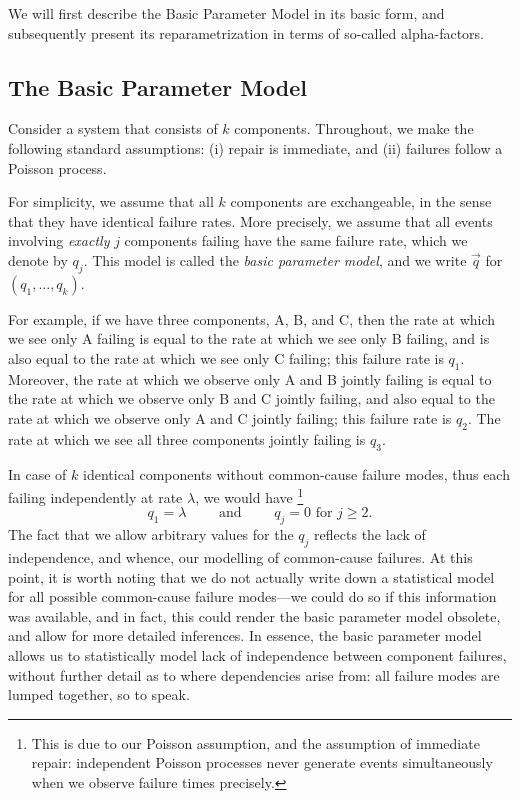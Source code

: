 We will first describe the Basic Parameter Model in its basic form,
and subsequently present its reparametrization in terms of so-called alpha-factors.


\subsection{The Basic Parameter Model}

Consider a system that consists of $k$ components.
Throughout, we make the following standard assumptions:
(i) repair is immediate, and
(ii) failures follow a Poisson process.

For simplicity, we assume that all $k$ components are exchangeable,
in the sense that they have identical failure rates.
More precisely,
we assume that all events involving \emph{exactly} $j$ components failing
have the same failure rate, which we denote by $q_j$.
This model is called the \emph{basic parameter model},
and we write $\vec{q}$ for $(q_1,\dots,q_k)$.

For example, if we have three components, A, B, and C,
then the rate at which we see only A failing
is equal to the rate at which we see only B failing,
and is also equal to the rate at which we see only C failing;
this failure rate is $q_1$.
Moreover, the rate at which we observe only A and B jointly failing
is equal to the rate at which we observe only B and C jointly failing,
and also equal to the rate at which we observe only A and C jointly failing;
this failure rate is $q_2$.
The rate at which we see all three components jointly failing is $q_3$.

In case of $k$ identical components without common-cause failure modes,
thus each failing independently at rate $\lambda$, we would have%
\footnote{This is due to our Poisson assumption, and the assumption of immediate repair:
independent Poisson processes never generate events simultaneously when we observe failure times precisely.}
\begin{equation*}
  q_1=\lambda\qquad \text{ and }\qquad q_j=0\text{ for }j\ge 2.
\end{equation*}
The fact that we allow arbitrary values for the $q_j$ reflects
the lack of independence, and whence, our modelling of common-cause failures.
At this point, it is worth noting that we do not actually write down a statistical model
for all possible common-cause failure modes---we could do so if this information was available,
and in fact, this could render the basic parameter model obsolete,
and allow for more detailed inferences.
In essence, the basic parameter model allows us to statistically model
lack of independence between component failures,
without further detail as to where dependencies arise from:
all failure modes are lumped together, so to speak.

